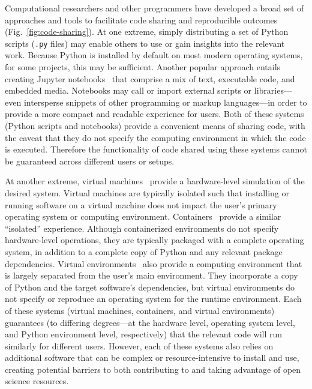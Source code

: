 \documentclass[preprint,12pt,a4paper]{elsarticle}
\begin{document}
Computational researchers and other programmers have developed a broad
set of approaches and tools to facilitate code sharing and
reproducible outcomes (Fig.~\ref{fig:code-sharing}). At one
extreme, simply distributing a set of Python scripts (\texttt{.py} files) may
enable others to use or gain insights into the relevant work. Because
Python is installed by default on most modern operating systems, for
some projects, this may be sufficient. Another popular approach
entails creating Jupyter
notebooks~\cite{KluyEtal16} that comprise a mix of text, executable
code, and embedded media. Notebooks may call or import external
scripts or libraries---even intersperse snippets of other programming
or markup lang\-uages---in order to provide a more compact and readable
experience for users. Both of these systems (Python scripts and
notebooks) provide a convenient means of sharing code, with the
caveat that they do not specify the computing environment in which the
code is executed. Therefore the functionality of code shared using
these systems cannot be guaranteed across different users or setups.

At another extreme, virtual machines~\cite{Gold74, AltiEtal05,
 Rose99} provide a hardware-level simulation of the desired system.
Virtual machines are typically isolated such
that installing or running software on a virtual machine does not
impact the user's primary operating system or computing environment.
Containers~\cite[e.g.,][]{Merk14, KurtEtal17} provide a similar
``isolated'' experience. Although containerized environments do not
specify hardware-level operations, they are typically packaged with a
complete operating system, in addition to a complete copy of Python
and any relevant package dependencies. Virtual
environments~\cite[e.g.,][]{Anac12, Eust19} also provide a computing
environment that is largely separated from the user's main
environment. They incorporate a copy of Python and the target
software's dependencies, but virtual environments do not specify or
reproduce an operating system for the runtime environment. Each of
these systems (virtual machines, containers, and virtual environments)
guarantees (to differing degrees---at the hardware level, operating
system level, and Python environment level, respectively) that the
relevant code will run similarly for different users. However, each
of these systems also relies on additional software that can be
complex or resource-intensive to install and use, creating potential
barriers to both contributing to and taking advantage of open science
resources.
\end{document}
